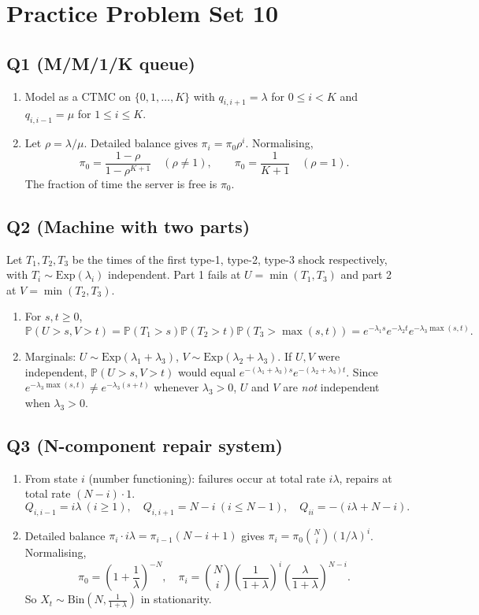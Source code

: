 \documentclass[11pt]{article}
\newcommand{\PP}{\mathbb{P}}
\newcommand{\1}{\mathbf{1}}
\begin{document}
\section{Practice Problem Set 10}

\subsection*{Q1 (M/M/1/K queue)}
\begin{enumerate}[label=(\alph*)]
\item Model as a CTMC on $\{0,1,\ldots,K\}$ with $q_{i,i+1}=\lambda$ for $0\le i<K$ and $q_{i,i-1}=\mu$ for $1\le i\le K$.
\item Let $\rho=\lambda/\mu$.  Detailed balance gives $\pi_i=\pi_0\rho^i$.  Normalising,
\[
\pi_0=\frac{1-\rho}{1-\rho^{K+1}}\quad(\rho\ne1),\qquad \pi_0=\frac{1}{K+1}\quad(\rho=1).
\]
The fraction of time the server is free is $\pi_0$.
\end{enumerate}

\subsection*{Q2 (Machine with two parts)}
Let $T_1,T_2,T_3$ be the times of the first type-1, type-2, type-3 shock respectively, with $T_i\sim\mathrm{Exp}(\lambda_i)$ independent.  Part 1 fails at $U=\min(T_1,T_3)$ and part 2 at $V=\min(T_2,T_3)$.
\begin{enumerate}[label=(\alph*)]
\item For $s,t\ge0$,
\[
\PP(U>s,V>t)=\PP(T_1>s)\PP(T_2>t)\PP(T_3>\max(s,t))
=e^{-\lambda_1 s}e^{-\lambda_2 t}e^{-\lambda_3\max(s,t)}.
\]
\item Marginals: $U\sim\mathrm{Exp}(\lambda_1+\lambda_3)$, $V\sim\mathrm{Exp}(\lambda_2+\lambda_3)$.  If $U,V$ were independent, $\PP(U>s,V>t)$ would equal $e^{-(\lambda_1+\lambda_3)s}e^{-(\lambda_2+\lambda_3)t}$.  Since $e^{-\lambda_3\max(s,t)}\ne e^{-\lambda_3(s+t)}$ whenever $\lambda_3>0$, $U$ and $V$ are \emph{not} independent when $\lambda_3>0$.
\end{enumerate}

\subsection*{Q3 (N-component repair system)}
\begin{enumerate}[label=(\alph*)]
\item From state $i$ (number functioning): failures occur at total rate $i\lambda$, repairs at total rate $(N-i)\cdot 1$.
\[
Q_{i,i-1}=i\lambda\ (i\ge1),\quad Q_{i,i+1}=N-i\ (i\le N-1),\quad Q_{ii}=-(i\lambda+N-i).
\]
\item Detailed balance $\pi_i\cdot i\lambda=\pi_{i-1}(N-i+1)$ gives $\pi_i=\pi_0\binom{N}{i}(1/\lambda)^i$.  Normalising,
\[
\pi_0=\left(1+\frac{1}{\lambda}\right)^{-N},\quad
\pi_i=\binom{N}{i}\left(\frac{1}{1+\lambda}\right)^i\left(\frac{\lambda}{1+\lambda}\right)^{N-i}.
\]
So $X_t\sim\mathrm{Bin}\!\left(N,\tfrac{1}{1+\lambda}\right)$ in stationarity.
\end{enumerate}
\end{document}
